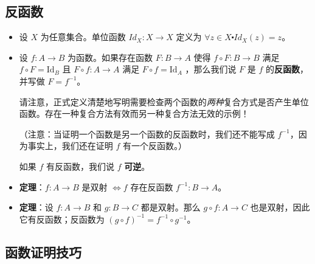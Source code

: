 \subsection{反函数}

\begin{itemize}
    \item 设 $X$ 为任意集合。单位函数 $Id_X : X \to X$ 定义为 $\forall z \in X \centerdot Id_X(z) = z$。
    \item 设 $f : A \to B$ 为函数。如果存在函数 $F : B \to A$ 使得 $f \circ F : B \to B$ 满足 $f \circ F = \text{Id}_B$ 且 $F \circ f : A \to A$ 满足 $F \circ f = \text{Id}_A$ ，那么我们说 $F$ 是 $f$ 的\textbf{反函数}，并写做 $F = f^{-1}$。

          请注意，正式定义清楚地写明需要检查两个函数的\emph{两种}复合方式是否产生单位函数。存在一种复合方法有效而另一种复合方法无效的示例！

          （注意：当证明一个函数是另一个函数的反函数时，我们还不能写成 $f^{-1}$，因为事实上，我们还在证明 $f$ 有一个反函数。）

          如果 $f$ 有反函数，我们说 $f$ \textbf{可逆}。
    \item \textbf{定理}：$f : A \to B$ 是双射 $\iff f$ 存在反函数 $f^{-1}: B \to A$。
    \item \textbf{定理}：设 $f : A \to B$ 和 $g : B \to C$ 都是双射。那么 $g \circ f : A \to C$ 也是双射，因此它有反函数；反函数为 $(g \circ f)^{-1} = f^{-1} \circ g^{-1}$。
\end{itemize}

\subsection{函数证明技巧}

